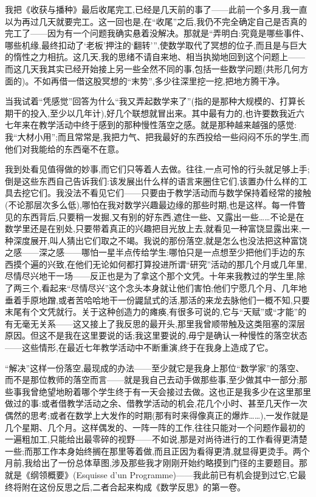 我把《收获与播种》最后收尾完工,已经是几天前的事了——此前一个多月,我一直以为再过几天就要完工。这一回也是,在“收尾”之后,我仍不完全确定自己是否真的完工了——因为有一个问题我确实悬着没解决。那就是“弄明白:究竟是哪些事件、哪些机缘,最终扣动了‘老板’押注的‘翻转’”,使数学取代了冥想的位子,而且是与巨大的惰性之力相抗。这几天,我的思绪不请自来地、相当执拗地回到这个问题上——而这几天我其实已经开始接上另一些全然不同的事,包括一些数学问题(共形几何方面的)。不如再借一借这股冥想的“末势”,多少往深里挖一挖,把地方腾干净。

当我试着“凭感觉”回答为什么“我又弄起数学来了”(指的是那种大规模的、打算长期干的投入,至少以几年计),好几个联想就冒出来。其中最有力的,也许要数我近六七年来在教学活动中终于感到的那种慢性落空之感。就是那种越来越强的感觉:我“大材小用”;而且常常是,我把力气、把我最好的东西投给一些闷闷不乐的学生,而他们对我能给的东西毫不在意。

 我到处看见值得做的妙事,而它们只等着人去做。往往,一点可怜的行头就足够上手;倒是这些东西自己告诉我们:该发展出什么样的语言来圈住它们,该置办什么样的工具去挖它们。我没法不看见它们——只要由于教学活动而与数学保持着经常的接触(不论那层次多么低),哪怕在我对数学兴趣最边缘的那些时期,也是这样。每一件瞥见的东西背后,只要稍一发掘,又有别的好东西,遮住一些、又露出一些……不论是在数学里还是在别处,只要带着真正的兴趣把目光放上去,就看见一种富饶显露出来,一种深度展开,叫人猜出它们取之不竭。我说的那份落空,就是怎么也没法把这种富饶之感——深之感——哪怕一星半点传给学生:哪怕只是一点想至少把他们手边的东西摸个遍的兴致,在他们无论如何都打算投进所谓“研究”活动的那几个月或几年里,尽情尽兴地干一场——反正也是为了拿这个那个文凭。十年来我教过的学生里,除了两三个,看起来“尽情尽兴”这个念头本身就让他们害怕;他们宁愿几个月、几年地垂着手原地蹭,或者苦哈哈地干一份鼹鼠式的活,那活的来龙去脉他们一概不知,只要末尾有个文凭就行。关于这种创造力的瘫痪,有很多可说的,它与“天赋”或“才能”的有无毫无关系——这又接上了我反思的最开头,那里我曾顺带触及这类阻塞的深层原因。但这不是我在这里要说的话;我这里要说的,毋宁是确认一种慢性的落空状态——这些情形,在最近七年教学活动中不断重演,终于在我身上造成了它。

 “解决”这样一份落空,最现成的办法——至少就它是我身上那位“数学家”的落空、而不是那位教师的落空而言——就是我自己去动手做那些事,至少做其中一部分;那些事我曾绝望地盼着哪个学生终于有一天会接过去做。这也正是我多少在这里那里做过的事:或者借教学活动之余、借教学活动的机会,花几个小时、甚至几天作一次偶然的思考;或者在数学上大发作的时期(那有时来得像真正的爆炸……),一发作就是几个星期、几个月。这样偶发的、一阵一阵的工作,往往只能对一个问题作最初的一遍粗加工,只能给出最零碎的视野——不如说,那是对尚待进行的工作看得更清楚一些;而那工作本身始终搁在那里等着做,而且正因为看得更清,就显得更烫手。两个月前,我给出了一份总体草图,涉及那些我才刚刚开始约略摸到门径的主要题目。那就是《纲领概要》(Esquisse d'un Programme)——我此前已有机会提到过它,它最终将附在这份反思之后,二者合起来构成《数学反思》的第一卷。

